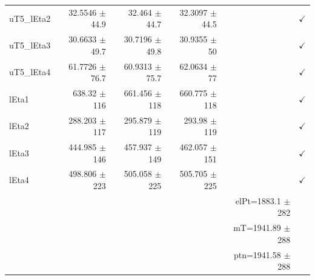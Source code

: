 \begin{table}[htbp]
\begin{tabular}{lrrrrr}
uT5\_lEta2 & 32.5546 $\pm$ 44.9 & 32.464 $\pm$ 44.7 & 32.3097 $\pm$ 44.5 &  & $\checkmark$ \\
uT5\_lEta3 & 30.6633 $\pm$ 49.7 & 30.7196 $\pm$ 49.8 & 30.9355 $\pm$ 50 &  & $\checkmark$ \\
uT5\_lEta4 & 61.7726 $\pm$ 76.7 & 60.9313 $\pm$ 75.7 & 62.0634 $\pm$ 77 &  & $\checkmark$ \\
\hline
lEta1 & 638.32 $\pm$ 116 & 661.456 $\pm$ 118 & 660.775 $\pm$ 118 &  & $\checkmark$ \\
lEta2 & 288.203 $\pm$ 117 & 295.879 $\pm$ 119 & 293.98 $\pm$ 119 &  & $\checkmark$ \\
lEta3 & 444.985 $\pm$ 146 & 457.937 $\pm$ 149 & 462.057 $\pm$ 151 &  & $\checkmark$ \\
lEta4 & 498.806 $\pm$ 223 & 505.058 $\pm$ 225 & 505.705 $\pm$ 225 &  & $\checkmark$ \\
\hline
 &  &  &  & elPt=1883.1 $\pm$ 282 &  \\
 &  &  &  & mT=1941.89 $\pm$ 288 &  \\
 &  &  &  & ptn=1941.58 $\pm$ 288 &  \\
\hline
\end{tabular}
\end{table}
